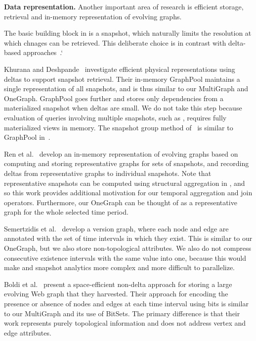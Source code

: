 
{\bf Data representation.}  Another important area of research is
efficient storage, retrieval and in-memory representation of evolving
graphs.  

The basic building block in \ql is a snapshot, which naturally limits
the resolution at which chnages can be retrieved. This deliberate
choice is in contrast with delta-based
approaches~\cite{Khurana2013,Koloniari2012,DBLP:journals/tos/MiaoHLWYZPCC15}.`

Khurana and Deshpande~\cite{Khurana2013} investigate efficient
physical representations using deltas to support snapshot retrieval.
Their in-memory GraphPool maintains a single representation of all
snapshots, and is thus similar to our MultiGraph and OneGraph.
GraphPool goes further and stores only dependencies from a
materialized snapshot when deltas are small.  We do not take
this step because evaluation of queries involving multiple snapshots,
such as , requires fully materialized views in memory.
The snapshot group method of~\cite{DBLP:journals/tos/MiaoHLWYZPCC15}
is similar to GraphPool in~\cite{Khurana2013}.

Ren et al.~\cite{Ren2011} develop an in-memory representation of
evolving graphs based on computing and storing representative graphs
for sets of snapshots, and recording deltas from representative graphs
to individual snapshots.  Note that representative snapshots can be
computed using structural aggregation in \ql, and so this work
provides additional motivation for our temporal aggregation and join
operators.  Furthermore, our OneGraph can be thought of as a
representative graph for the whole selected time period.

Semertzidis et al.~\cite{Semertzidis2015} develop a version graph,
where each node and edge are annotated with the set of time intervals
in which they exist.  This is similar to our OneGraph, but we also
store non-topological attributes.  We also do not compress consecutive
existence intervals with the same value into one, because this would
make  and snapshot analytics more complex and more
difficult to parallelize.

Boldi et al.~\cite{Boldi2008} present a space-efficient non-delta
approach for storing a large evolving Web graph that they harvested.
Their approach for encoding the presence or absence of nodes and edges
at each time interval using bits is similar to our MultiGraph and its
use of BitSets.  The primary difference is that their work represents
purely topological information and does not address vertex and edge
attributes.

